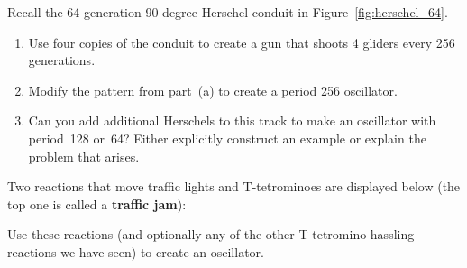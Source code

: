 \begin{multicols}{2}
	
	\mfilbreak
	
	
	\begin{problem}\label{exer:machine_gun} 
		Recall the 64-generation 90-degree Herschel conduit in Figure~\ref{fig:herschel_64}.\smallskip
		
		\begin{enumerate}[label=\bf\color{ocre}(\alph*)]
			\item Use four copies of the conduit to create a gun that shoots 4 gliders every 256 generations.
			
			\item Modify the pattern from part~(a) to create a period 256 oscillator. %
			
			\item Can you add additional Herschels to this track to make an oscillator with period~128 or~64? Either explicitly construct an example or explain the problem that arises. %
		\end{enumerate}
	\end{problem}
	
	
	\mfilbreak
	
	
	\begin{problemstar}\label{exer:traffic_jam} 
		Two reactions that move traffic lights and T-tetrominoes are displayed below (the top one is called a \textbf{traffic jam}):
		
		\noindent\begin{center}
		\end{center}\vspace*{-0.35cm}
		
		\noindent\begin{center}
		\end{center}
		
		\noindent Use these reactions (and optionally any of the other T-tetromino hassling reactions we have seen) to create an oscillator.
	\end{problemstar}
	

\end{multicols}
